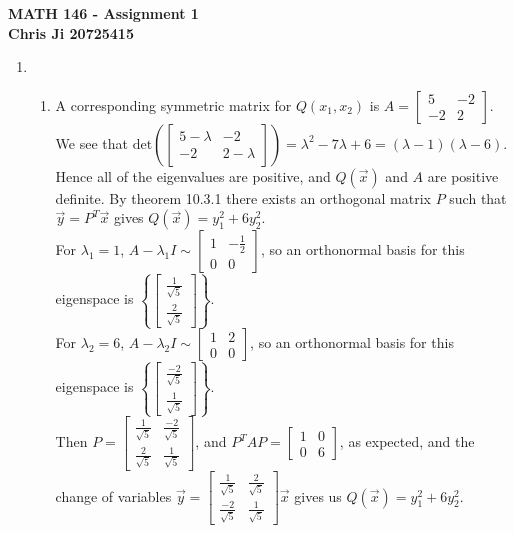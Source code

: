 \documentclass[10pt,english]{article}
\begin{document}
\noindent \begin{center}
\textbf{\large{}MATH 146 - Assignment 1}\\
\textbf{\large{}Chris Ji 20725415}
\par\end{center}{\large \par}
\medskip{}

\begin{enumerate}
\item \begin{enumerate}
    \item A corresponding symmetric matrix for $Q(x_1,x_2)$ is $A=\begin{bmatrix}5&-2\\-2&2\end{bmatrix}$. We see that $\text{det}\left(\begin{bmatrix}5-\lambda&-2\\-2&2-\lambda\end{bmatrix}\right)=\lambda^2-7\lambda+6=(\lambda-1)(\lambda-6)$. Hence all of the eigenvalues are positive, and $Q(\vec{x})$ and $A$ are positive definite. By theorem 10.3.1 there exists an orthogonal matrix $P$ such that $\vec{y}=P^T\vec{x}$ gives $Q(\vec{x})=y_1^2+6y_2^2$. \\ 
    For $\lambda_1=1$, $A-\lambda_1I\sim\begin{bmatrix}1&-\frac{1}{2}\\0&0\end{bmatrix}$, so an orthonormal basis for this eigenspace is $\left\{\begin{bmatrix}\frac{1}{\sqrt{5}}\\\frac{2}{\sqrt{5}}\end{bmatrix}\right\}$. \\ 
    For $\lambda_2=6$, $A-\lambda_2I\sim\begin{bmatrix}1&2\\0&0\end{bmatrix}$, so an orthonormal basis for this eigenspace is $\left\{\begin{bmatrix}\frac{-2}{\sqrt{5}}\\\frac{1}{\sqrt{5}}\end{bmatrix}\right\}$. \\ 
    Then $P=\begin{bmatrix}\frac{1}{\sqrt{5}}&\frac{-2}{\sqrt{5}}\\\frac{2}{\sqrt{5}}&\frac{1}{\sqrt{5}}\end{bmatrix}$, and $P^TAP=\begin{bmatrix}1&0\\0&6\end{bmatrix}$, as expected, and the change of variables $\vec{y}=\begin{bmatrix}\frac{1}{\sqrt{5}}&\frac{2}{\sqrt{5}}\\\frac{-2}{\sqrt{5}}&\frac{1}{\sqrt{5}}\end{bmatrix}\vec{x}$ gives us $Q(\vec{x})=y_1^2+6y_2^2$.

\end{enumerate}
\end{enumerate}
\end{document}
